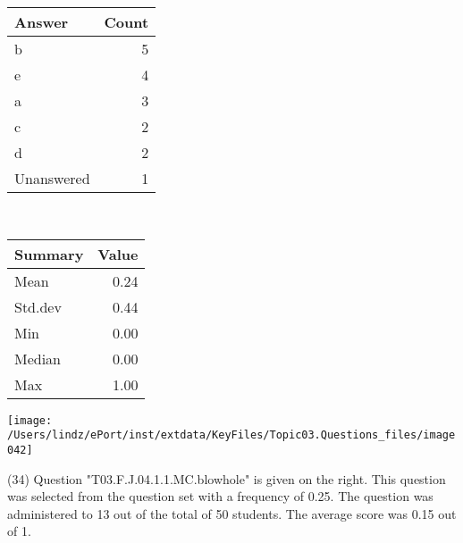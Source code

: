 \documentclass[12pt,english,nohyper]{tufte-handout}\usepackage[]{graphicx}\usepackage[]{color}
\begin{document}
\begin{center}%
\begin{tabular}{lr}
  \hline
Answer & Count \\ 
  \hline
b &   5 \\ 
  e &   4 \\ 
  a &   3 \\ 
  c &   2 \\ 
  d &   2 \\ 
  Unanswered &   1 \\ 
   \hline
\end{tabular}
~~~~~~~~%
\begin{tabular}{lr}
  \hline
Summary & Value \\ 
  \hline
Mean & 0.24 \\ 
  Std.dev & 0.44 \\ 
  Min & 0.00 \\ 
  Median & 0.00 \\ 
  Max & 1.00 \\ 
   \hline
\end{tabular}
\end{center}\newpage{}



\vspace{5cm}\begin{marginfigure}\texttt{[image: /Users/lindz/ePort/inst/extdata/KeyFiles/Topic03.Questions\_files/image042]}\end{marginfigure}\vspace{-5cm} (34) Question "T03.F.J.04.1.1.MC.blowhole" is given on the right. This question was selected from the question set with a frequency of 0.25. The question was administered to 13 out of the total of 50 students. The average score was 0.15 out of 1.
\end{document}
